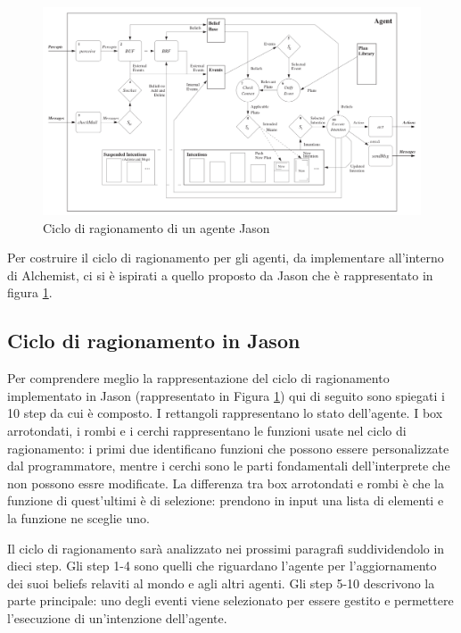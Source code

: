 \documentclass[12pt,a4paper,openright,twoside]{report}
\begin{document}
\begin{figure}[h] %
\begin{center} %
\includegraphics[width=16cm]{images/reasoningCicle.png} %
\caption[Ciclo di ragionamento di un agente]{Ciclo di ragionamento di un agente Jason} \label{fig:reasoningCicle}
\end{center}
\end{figure}

Per costruire il ciclo di ragionamento per gli agenti, da implementare all'interno di Alchemist, ci si \`e ispirati a quello proposto da Jason che \`e rappresentato in figura \ref{fig:reasoningCicle}.

\subsection{Ciclo di ragionamento in Jason}
Per comprendere meglio la rappresentazione del ciclo di ragionamento implementato in Jason (rappresentato in Figura \ref{fig:reasoningCicle}) qui di seguito sono spiegati i 10 step da cui \`e composto.
I rettangoli rappresentano lo stato dell'agente. I box arrotondati, i rombi e i cerchi rappresentano le funzioni usate nel ciclo di ragionamento: i primi due identificano funzioni che possono essere personalizzate dal programmatore, mentre i cerchi sono le parti fondamentali dell'interprete che non possono essre modificate. La differenza tra box arrotondati e rombi \`e che la funzione di quest'ultimi \`e di selezione: prendono in input una lista di elementi e la funzione ne sceglie uno.

Il ciclo di ragionamento sar\`a analizzato nei prossimi paragrafi suddividendolo in dieci step. Gli step 1-4 sono quelli che riguardano l'agente per l'aggiornamento dei suoi beliefs relaviti al mondo e agli altri agenti. Gli step 5-10 descrivono la parte principale: uno degli eventi viene selezionato per essere gestito e permettere l'esecuzione di un'intenzione dell'agente.
\end{document}
